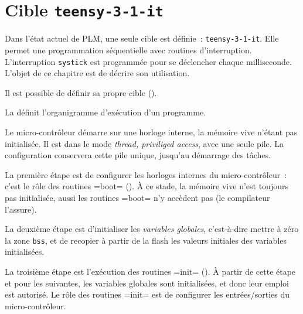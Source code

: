 




\chapter{Cible \texttt{teensy-3-1-it}}

Dans l'état actuel de PLM, une seule cible est définie~: \texttt{teensy-3-1-it}.  Elle permet une programmation séquentielle avec routines d'interruption. L'interruption \texttt{systick} est programmée pour se déclencher chaque milliseconde. L'objet de ce chapitre est de décrire son utilisation.

Il est possible de définir sa propre cible ().





















La  définit l'organigramme d'exécution d'un programme.

Le micro-contrôleur démarre sur une horloge interne, la mémoire vive n'étant pas initialisée. Il est dans le mode \emph{thread, priviliged access}, avec une seule pile. La configuration conservera cette pile unique, jusqu'au démarrage des tâches.

La première étape est de configurer les horloges internes du micro-contrôleur~: c'est le rôle des routines \plm=boot= (). À ce stade, la mémoire vive n'est toujours pas initialisée, aussi les routines \plm=boot= n'y accèdent pas (le compilateur l'assure).

La deuxième étape est d'initialiser les \emph{variables globales}, c'est-à-dire mettre à zéro la zone \texttt{bss}, et de recopier à partir de la flash les valeurs initiales des variables initialisées.

La troisième étape est l'exécution des routines \plm=init= (). À partir de cette étape et pour les suivantes, les variables globales sont initialisées, et donc leur emploi est autorisé. Le rôle des routines \plm=init= est de configurer les entrées/sorties du micro-contrôleur.

